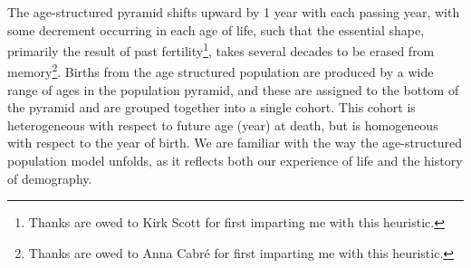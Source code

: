  \FloatBarrier
The age-structured pyramid shifts upward by 1 year with
each passing year, with some decrement occurring in each age of life, such that
the essential shape, primarily the result of past fertility\footnote{Thanks are
owed to Kirk Scott for first imparting me with this heuristic.}, takes several
decades to be erased from memory\footnote{Thanks are owed to Anna Cabr\'{e} for
first imparting me with this heuristic.}. Births from the age structured population 
are produced by a wide range of ages in the population pyramid, and these
are assigned to the bottom of the pyramid and are grouped together into a single
cohort. This cohort is heterogeneous with respect to future age (year) at death, 
but is homogeneous with respect to the year of birth. We are familiar with
the way the age-structured population model unfolds, as it
reflects both our experience of life and the history of demography.